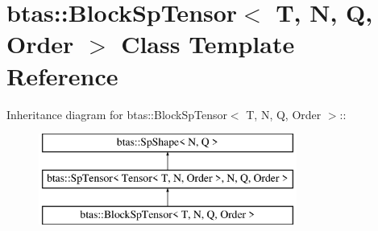 \hypertarget{classbtas_1_1_block_sp_tensor}{
\section{btas::BlockSpTensor$<$ T, N, Q, Order $>$ Class Template Reference}
\label{classbtas_1_1_block_sp_tensor}
}
Inheritance diagram for btas::BlockSpTensor$<$ T, N, Q, Order $>$::\begin{figure}[H]
\begin{center}
\leavevmode
\includegraphics[height=3cm]{classbtas_1_1_block_sp_tensor}
\end{center}
\end{figure}
